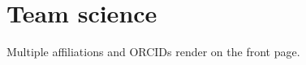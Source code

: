 \documentclass[config/load-project=false,document/type=paper,metadata/author={INSR Example Author},metadata/institution={INSR Example Institution},metadata/title={Multi-author Paper Example}]{insr}
\begin{document}
\INSRMakeTitle\section{Team science}Multiple affiliations and ORCIDs render on the front page.
\end{document}

